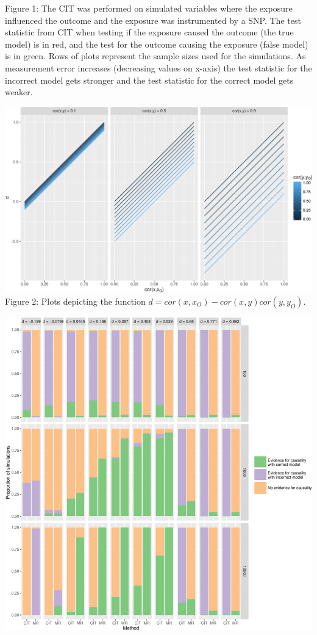 \documentclass[]{article}
\begin{document}
Figure 1: The CIT was performed on simulated variables where the
exposure influenced the outcome and the exposure was instrumented by a
SNP. The test statistic from CIT when testing if the exposure caused the
outcome (the true model) is in red, and the test for the outcome causing
the exposure (false model) is in green. Rows of plots represent the
sample sizes used for the simulations. As measurement error increases
(decreasing values on x-axis) the test statistic for the incorrect model
gets stronger and the test statistic for the correct model gets weaker.

\newpage

\includegraphics{manuscript_files/figure-latex/d_relationship_figure-1.pdf}\\
Figure 2: Plots depicting the function
\(d = cor(x, x_O) - cor(x,y)cor(y, y_O)\).

\newpage

\includegraphics{manuscript_files/figure-latex/cit_mr_comparison_figure-1.pdf}
\end{document}
